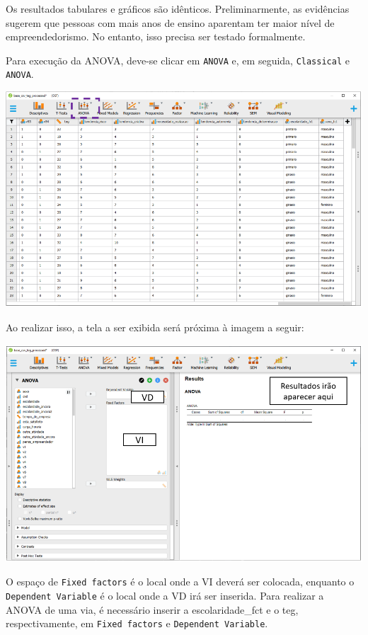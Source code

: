 \documentclass[
]{book}
\begin{document}
Os resultados tabulares e gráficos são idênticos. Preliminarmente, as
evidências sugerem que pessoas com mais anos de ensino aparentam ter
maior nível de empreendedorismo. No entanto, isso precisa ser testado
formalmente.

Para execução da ANOVA, deve-se clicar em \texttt{ANOVA} e, em seguida,
\texttt{Classical} e \texttt{ANOVA}.

\includegraphics{./img/cap_anova_interface.png}

Ao realizar isso, a tela a ser exibida será próxima à imagem a seguir:

\includegraphics{./img/cap_anova_interface2.png}

O espaço de \texttt{Fixed\ factors} é o local onde a VI deverá ser
colocada, enquanto o \texttt{Dependent\ Variable} é o local onde a VD
irá ser inserida. Para realizar a ANOVA de uma via, é necessário inserir
a escolaridade\_fct e o teg, respectivamente, em \texttt{Fixed\ factors}
e \texttt{Dependent\ Variable}.
\end{document}
